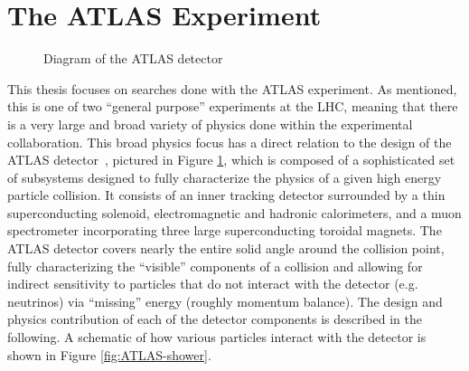 \section{The ATLAS Experiment}
\label{sec:ATLAS}

\begin{figure}[ht]
\centering
{}
\caption{Diagram of the ATLAS detector \cite{DetectorImage} \label{fig:ATLAS-det}}
\end{figure}

This thesis focuses on searches done with the ATLAS experiment. As mentioned, this is 
one of two ``general purpose'' experiments at the LHC, meaning that there is a
very large and broad variety of physics done within the experimental collaboration. 
This broad physics focus has a direct relation to the design of the ATLAS detector~\cite{PERF-2007-01}, pictured 
in Figure \ref{fig:ATLAS-det}, which is composed of a sophisticated set of subsystems designed 
to fully characterize the physics of a given high energy particle collision. It consists of an inner 
tracking detector surrounded by a thin superconducting solenoid, electromagnetic and hadronic calorimeters,
and a muon spectrometer incorporating three large superconducting toroidal magnets. The ATLAS detector 
covers nearly the entire solid angle around the collision point, fully characterizing the ``visible'' 
components of a collision and allowing for indirect sensitivity to particles that do not interact with the detector 
(e.g. neutrinos) via ``missing'' energy (roughly momentum balance). The design and physics 
contribution of each of the detector components is described in the following. A schematic of how various particles 
interact with the detector is shown in Figure \ref{fig:ATLAS-shower}.

